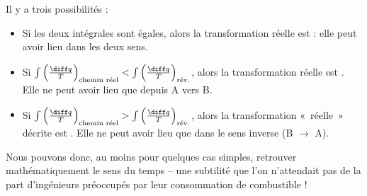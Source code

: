 		Il y a trois possibilités :
			\begin{itemize}
				\item Si les deux intégrales sont égales, alors la transformation réelle est  : elle peut avoir lieu dans les deux sens.
				\item Si $\int \left(\frac{\diff q}{T}\right)_\text{chemin réel} < \int \left(\frac{\diff q}{T}\right)_\text{rév.}$, alors la transformation réelle est . Elle ne peut avoir lieu que depuis A vers B.
				\item Si $\int \left(\frac{\diff q}{T}\right)_\text{chemin réel} > \int \left(\frac{\diff q}{T}\right)_\text{rév.}$, alors la transformation «~réelle~» décrite est . Elle ne peut avoir lieu que dans le sens inverse (B $\to$ A).
			\end{itemize}
		
		Nous pouvons donc, au moins pour quelques cas simples, retrouver mathématiquement le sens du temps -- une subtilité que l’on n’attendait pas de la part d’ingénieurs préoccupés par leur consommation de combustible !

